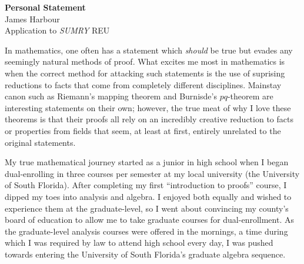\documentclass[11pt]{article}
\begin{document}
\begin{center}
  \textbf{Personal Statement}\\
  James Harbour \\
  Application to \emph{SUMRY} REU
\end{center}



In mathematics, one often has a statement which \emph{should} be true but evades any seemingly natural methods of proof. What excites me most in mathematics is when the correct method for attacking such statements is the use of suprising reductions to facts that come from completely different disciplines. Mainstay canon such as Riemann's mapping theorem and Burnisde's $pq$-theorem are interesting statements on their own; however, the true meat of why I love these theorems is that their proofs all rely on an incredibly creative reduction to facts or properties from fields that seem, at least at first, entirely unrelated to the original statements.







My true mathematical journey started as a junior in high school when I began dual-enrolling in three courses per semester at my local university (the University of South Florida). After completing my first ``introduction to proofs'' course, I dipped my toes into analysis and algebra. I enjoyed both equally and wished to experience them at the graduate-level, so I went about convincing my county's board of education to allow me to take graduate courses for dual-enrollment. As the graduate-level analysis courses were offered in the mornings, a time during which I was required by law to attend high school every day, I was pushed towards entering the University of South Florida's graduate algebra sequence.
\end{document}
